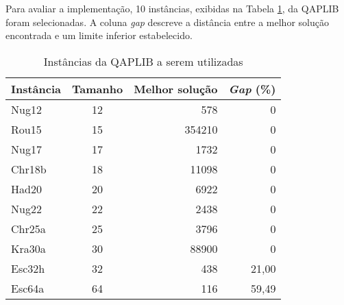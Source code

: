 Para avaliar a implementação, 10 instâncias, exibidas na Tabela
\ref{qapinst}, da QAPLIB \cite{qaplib} foram selecionadas. A coluna
\textit{gap} descreve a distância entre a melhor solução encontrada e
um limite inferior estabelecido.

\begin{table}[H]
  \caption{Instâncias da QAPLIB a serem utilizadas\label{qapinst}}
  \centering
  \begin{tabular}{l c r r}
    \toprule
    Instância & Tamanho & Melhor solução & \textit{Gap} (\%) \\
    \midrule
    Nug12 & 12 & 578 & 0 \\
    Rou15 & 15 & 354210 & 0 \\
    Nug17 & 17 & 1732 & 0 \\
    Chr18b & 18 & 11098 & 0 \\
    Had20 & 20 & 6922 & 0 \\
    Nug22 & 22 & 2438 & 0 \\
    Chr25a & 25 & 3796 & 0 \\
    Kra30a & 30 & 88900 & 0 \\
    Esc32h & 32 & 438 & 21,00 \\
    Esc64a & 64 & 116 & 59,49 \\
    \bottomrule
  \end{tabular}
\end{table}
